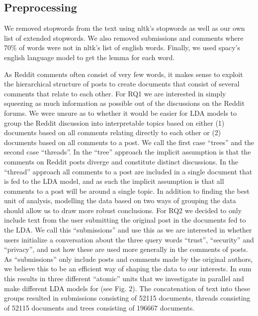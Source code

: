 \documentclass{article}
\begin{document}
    \subsection{Preprocessing}
    We removed stopwords from the text using nltk’s \cite{loper2002nltk} stopwords as well as our own list of extended stopwords. We also removed submissions and comments where 70\% of words were not in nltk’s list of english words. Finally, we used spacy’s \cite{spacy2} english language model to get the lemma for each word. 

As Reddit comments often consist of very few words, it makes sense to exploit the hierarchical structure of posts to create documents that consist of several comments that relate to each other. For RQ1 we are interested in simply squeezing as much information as possible out of the discussions on the Reddit forums. We were unsure as to whether it would be easier for LDA models to group the Reddit discussion into interpretable topics based on either (1) documents based on all comments relating directly to each other or (2) documents based on all comments to a post. We call the first case “trees” and the second case “threads”. In the “tree” approach the implicit assumption is that the comments on Reddit posts diverge and constitute distinct discussions. In the “thread” approach all comments to a post are included in a single document that is fed to the LDA model, and as such the implicit assumption is that all comments to a post will be around a single topic. In addition to finding the best unit of analysis, modelling the data based on two ways of grouping the data should allow us to draw more robust conclusions. 
For RQ2 we decided to only include text from the user submitting the original post in the documents fed to the LDA. We call this “submissions” and use this as we are interested in whether users initialize a conversation about the three query words “trust”, “security” and “privacy”, and not how these are used more generally in the comments of posts. As “submissions” only include posts and comments made by the original authors, we believe this to be an efficient way of shaping the data to our interests. In sum this results in three different “atomic” units that we investigate in parallel and make different LDA models for (see Fig. 2). The concatenation of text into these groups resulted in submissions consisting of 52115 documents, threads consisting of 52115 documents and trees consisting of 196667 documents. 
\end{document}
